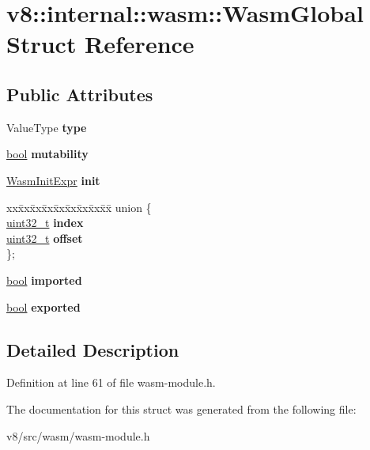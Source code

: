 \hypertarget{structv8_1_1internal_1_1wasm_1_1WasmGlobal}{}\section{v8\+:\+:internal\+:\+:wasm\+:\+:Wasm\+Global Struct Reference}
\label{structv8_1_1internal_1_1wasm_1_1WasmGlobal}
\subsection*{Public Attributes}
\begin{DoxyCompactItemize}
\item 
\mbox{\label{structv8_1_1internal_1_1wasm_1_1WasmGlobal_a65b8d04d9022b2619f9bc51256d6946e}} 
Value\+Type {\bfseries type}
\item 
\mbox{\label{structv8_1_1internal_1_1wasm_1_1WasmGlobal_ab337075faef641441d4180f20d0a9365}} 
\mbox{\hyperlink{classbool}{bool}} {\bfseries mutability}
\item 
\mbox{\label{structv8_1_1internal_1_1wasm_1_1WasmGlobal_ae3a39ca0ebc211159461d88b0fb87850}} 
\mbox{\hyperlink{structv8_1_1internal_1_1wasm_1_1WasmInitExpr}{Wasm\+Init\+Expr}} {\bfseries init}
\item 
\mbox{\label{structv8_1_1internal_1_1wasm_1_1WasmGlobal_a2667909f0f43468abbba9dbe37e1ef97}} 
\begin{tabbing}
xx\=xx\=xx\=xx\=xx\=xx\=xx\=xx\=xx\=\kill
union \{\\
\>\mbox{\hyperlink{classuint32__t}{uint32\_t}} {\bfseries index}\\
\>\mbox{\hyperlink{classuint32__t}{uint32\_t}} {\bfseries offset}\\
\}; \\

\end{tabbing}\item 
\mbox{\label{structv8_1_1internal_1_1wasm_1_1WasmGlobal_a24043583c0a876cc3c838259974492f5}} 
\mbox{\hyperlink{classbool}{bool}} {\bfseries imported}
\item 
\mbox{\label{structv8_1_1internal_1_1wasm_1_1WasmGlobal_a92b32d07dd8f7c3cac889c1f21f0d269}} 
\mbox{\hyperlink{classbool}{bool}} {\bfseries exported}
\end{DoxyCompactItemize}


\subsection{Detailed Description}


Definition at line 61 of file wasm-\/module.\+h.



The documentation for this struct was generated from the following file\+:\begin{DoxyCompactItemize}
\item 
v8/src/wasm/wasm-\/module.\+h\end{DoxyCompactItemize}
